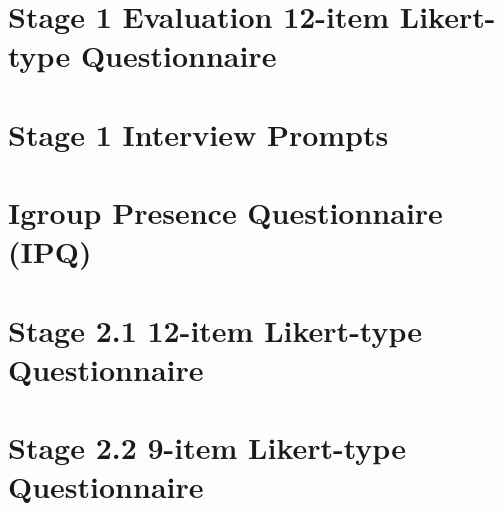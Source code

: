 \documentclass{report}
\begin{document}
\begin{appendices}

\chapter{Stage 1 Evaluation 12-item Likert-type Questionnaire}

\label{appendix-12-item-likert-type-questionnaire-stage-1}

\chapter{Stage 1 Interview Prompts}

\label{appendix-interview-questions-stage-1}

\chapter{Igroup Presence Questionnaire (IPQ)}

\label{appendix-igroup-presence-questionnaire}

\chapter{Stage 2.1 12-item Likert-type Questionnaire}

\label{appendix-12-item-likert-type-questionnaire-stage-2-1}

\chapter{Stage 2.2 9-item Likert-type Questionnaire}

\label{appendix-9-item-likert-type-questionnaire-stage-2-2}

\end{appendices}





\end{document}
